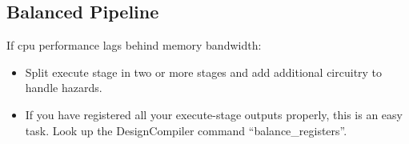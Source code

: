 \subsection{Balanced Pipeline}
If cpu performance lags behind memory bandwidth:
\begin{itemize}
	\item Split execute stage in two or more stages and add additional circuitry to handle hazards.
	\item If you have registered all your execute-stage outputs properly, this is an easy task. Look up the DesignCompiler command ``balance\_registers''.
\end{itemize}